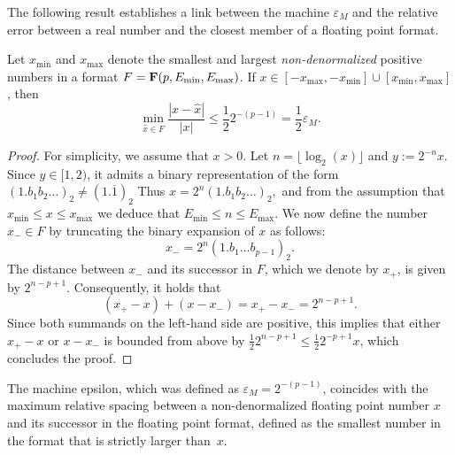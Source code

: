The following result establishes a link between the machine $\varepsilon_M$ and
the relative error between a real number and the closest member of a floating point format.
\begin{proposition}
    \label{prop:relative_error_and_machine_epsilon}
    Let $x_{\min}$ and $x_{\max}$ denote the smallest and largest \emph{non-denormalized} positive numbers in a format $F = \mathbf F(p, E_{\min}, E_{\max})$.
    If $x \in [-x_{\max}, -x_{\min}] \cup [x_{\min}, x_{\max}]$,
    then
    \begin{equation}
        \label{eq:bound_epsilon_machine}
        \min_{\widehat x \in F} \frac{|x - \widehat x|}{|x|} \leq \frac{1}{2} 2^{-(p-1)}
        = \frac{1}{2} \varepsilon_M.
    \end{equation}
\end{proposition}
\begin{proof}
    For simplicity, we assume that $x > 0$.
    Let $n = \lfloor \log_2(x) \rfloor$ and $y := 2^{-n} x$.
    Since $y \in [1, 2)$,
    it admits a binary representation of the form
    \(
        (1.b_1 b_2\dots)_2 \neq (1.\overline 1)_2
    \)
    Thus
    \(
        x = 2^{n} (1.b_1 b_2\dots)_2,
    \)
    and from the assumption that $x_{\min} \leq x \leq x_{\max}$
    we deduce that $E_{\min} \leq n \leq E_{\max}$.
    We now define the number $x_- \in F$ by truncating the binary expansion of $x$ as follows:
    \[
        x_- = 2^n (1.b_1 \dots b_{p-1})_2.
    \]
    The distance between $x_-$ and its successor in $F$,
    which we denote by $x_+$, is given by $2^{n-p+1}$.
    Consequently, it holds that
    \[
        (x_+ - x) + (x-x_-) = x_+ - x_- = 2^{n-p+1}.
    \]
    Since both summands on the left-hand side are positive,
    this implies that either $x_+ - x$ or $x - x_-$ is bounded from above by $\frac{1}{2} 2^{n-p+1} \leq \frac{1}{2} 2^{-p+1}x$,
    which concludes the proof.
\end{proof}

The machine epsilon,
which was defined as $\varepsilon_M = 2^{-(p-1)}$,
coincides with the maximum relative spacing between a non-denormalized floating point number $x$ and its successor in the floating point format,
defined as the smallest number in the format that is strictly larger than~$x$.

